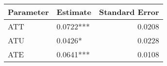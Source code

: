 \begin{tabular}{llr}
\toprule
Parameter &  Estimate &  Standard Error \\
\midrule
      ATT & 0.0722*** &          0.0208 \\
      ATU &   0.0426* &          0.0228 \\
      ATE & 0.0641*** &          0.0108 \\
\bottomrule
\end{tabular}
